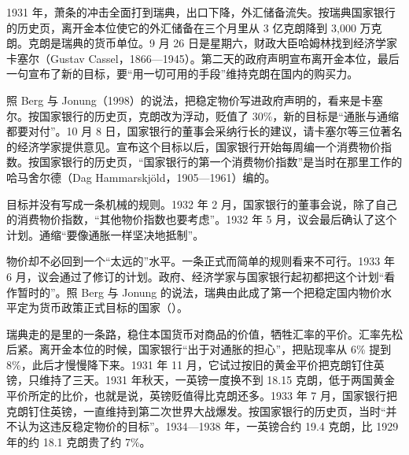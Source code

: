 1931 年，萧条的冲击全面打到瑞典，出口下降，外汇储备流失\cite{berg1998}。按瑞典国家银行的历史页，离开金本位使它的外汇储备在三个月里从 3 亿克朗降到 3,000 万克朗\cite{riksbank2026d}。克朗是瑞典的货币单位。9 月 26 日是星期六，财政大臣哈姆林找到经济学家卡塞尔（Gustav Cassel，1866—1945）\cite{berg1998,loc30}。第二天的政府声明宣布离开金本位，最后一句宣布了新的目标，要“用一切可用的手段”维持克朗在国内的购买力\cite{berg1998}。

照 Berg 与 Jonung（1998）的说法，把稳定物价写进政府声明的，看来是卡塞尔\cite{berg1998}。按国家银行的历史页，克朗改为浮动，贬值了 30\%，新的目标是“通胀与通缩都要对付”\cite{riksbank2026d}。10 月 8 日，国家银行的董事会采纳行长的建议，请卡塞尔等三位著名的经济学家提供意见\cite{berg1998}。宣布这个目标以后，国家银行开始每周编一个消费物价指数\cite{berg1998}。按国家银行的历史页，“国家银行的第一个消费物价指数”是当时在那里工作的哈马舍尔德（Dag Hammarskjöld，1905—1961）编的\cite{riksbank2026d}。

目标并没有写成一条机械的规则。1932 年 2 月，国家银行的董事会说，除了自己的消费物价指数，“其他物价指数也要考虑”\cite{berg1998}。1932 年 5 月，议会最后确认了这个计划\cite{berg1998}。通缩“要像通胀一样坚决地抵制”\cite{berg1998}。

物价却不必回到一个“太远的”水平\cite{berg1998}。一条正式而简单的规则看来不可行\cite{berg1998}。1933 年 6 月，议会通过了修订的计划\cite{berg1998}。政府、经济学家与国家银行起初都把这个计划“看作暂时的”\cite{berg1998}。照 Berg 与 Jonung 的说法，瑞典由此成了第一个把稳定国内物价水平定为货币政策正式目标的国家（）\cite{berg1998}。

瑞典走的是里的一条路，稳住本国货币对商品的价值，牺牲汇率的平价。汇率先松后紧。离开金本位的时候，国家银行“出于对通胀的担心”，把贴现率从 6\% 提到 8\%，此后才慢慢降下来\cite{berg1998}。1931 年 11 月，它试过按旧的黄金平价把克朗钉住英镑，只维持了三天\cite{berg1998}。1931 年秋天，一英镑一度换不到 18.15 克朗，低于两国黄金平价所定的比价，也就是说，英镑贬值得比克朗还多\cite{berg1998}。1933 年 7 月，国家银行把克朗钉住英镑，一直维持到第二次世界大战爆发\cite{berg1998}。按国家银行的历史页，当时“并不认为这违反稳定物价的目标”\cite{riksbank2026d}。1934—1938 年，一英镑合约 19.4 克朗，比 1929 年的约 18.1 克朗贵了约 7\%\cite{bms1943}。

